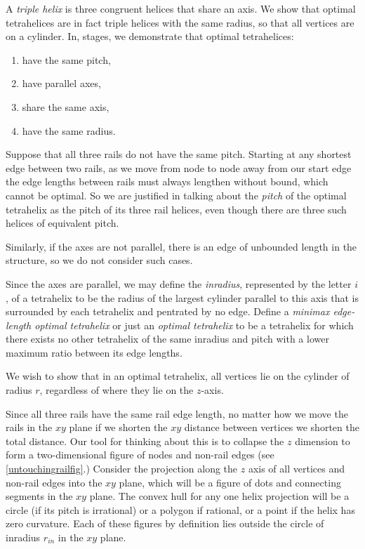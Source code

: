\documentclass[review]{siamonline1116}
\begin{document}
A \emph{triple helix} is three congruent helices that share an axis. We show that
optimal tetrahelices are in fact triple helices with the same radius, so that all
vertices are on a cylinder. In, stages, we demonstrate that optimal tetrahelices:
\begin{enumerate}
\item have the same pitch,
\item have parallel axes,
\item share the same axis,
\item have the same radius.
\end{enumerate}


Suppose that all three rails do not have the same pitch. Starting at any shortest edge between
two rails, as we move
from node to node away from our start edge the edge lengths
between rails must always lengthen without bound,
which cannot be optimal.
So we are justified in talking about the
\emph{pitch} of 
the optimal tetrahelix as the pitch of its three rail helices, even though there are
three such helices of equivalent pitch.

Similarly, if the axes are not parallel, there is an edge of
unbounded length in the structure, so we do not consider such cases.

Since the axes are parallel, we may define the \emph{inradius}, represented by the letter $i$, of a
tetrahelix to be the radius of the largest
cylinder parallel to this axis that is surrounded by each tetrahelix and pentrated by no edge.
Define a \emph{minimax edge-length optimal tetrahelix} or just an
\emph{optimal tetrahelix} to be a tetrahelix for which there exists
no other tetrahelix of the same inradius and pitch with a lower maximum
ratio between its edge lengths. 

We wish to show that in an optimal tetrahelix, all vertices lie on the cylinder
of radius $r$, regardless of where they lie on the $z$-axis.

Since all three rails have the same rail edge length, no matter how we
move the rails in the $xy$ plane if we shorten the $xy$ distance between
vertices we shorten the total distance.
Our tool for thinking about this is to collapse the $z$ dimension to form
a two-dimensional figure of nodes and non-rail edges (see \cref{untouchingrailfig}.)
Consider the projection along the $z$ axis of all vertices and non-rail edges into the $xy$ plane, which will be
a figure of dots and connecting segments in the $xy$ plane. The convex
hull for any one helix projection will be a circle (if its pitch is
irrational) or a polygon if rational, or a point if the helix has
zero curvature. Each of these figures by definition lies outside the
circle of inradius $r_{in}$ in the $xy$ plane.
\end{document}
